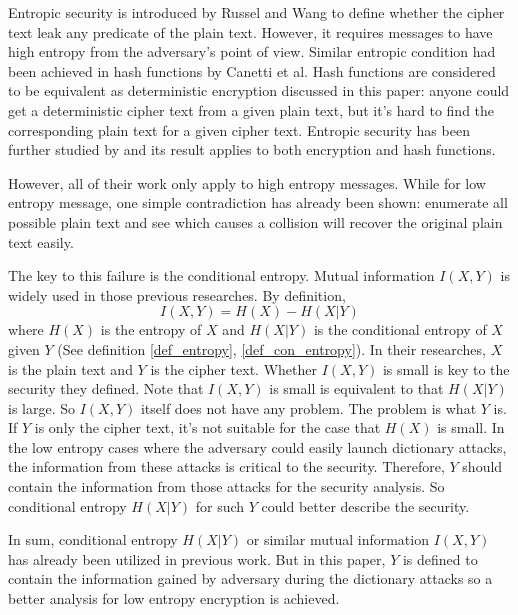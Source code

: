 \documentclass[10pt, conference, compsocconf]{IEEEtran}
\begin{document}
	Entropic security is introduced by Russel and Wang\cite{Russel02howto} to define
	whether the cipher text leak any predicate of the plain text. However,
	it requires messages to have high entropy from
	the adversary's point of view. Similar entropic condition had been
	achieved in hash functions by Canetti et al\cite{Canetti97towardsrealizing, Canetti_perfectlyone-way}. 
	Hash functions are
	considered to be equivalent as deterministic encryption discussed in this
	paper: anyone could get a deterministic cipher text from a
	given plain text, but it's hard to find the corresponding plain text
	for a given cipher text. Entropic security has been further 
	studied by \cite{entropic_wang}
	and its result applies to both encryption and hash functions.
	
	However, all of their work only apply to high entropy messages.
	While for low entropy message, 
	one simple contradiction has already been
	shown: enumerate all possible plain text and see which causes a collision
	will recover the original plain text easily.
	
	The key to this failure is the conditional entropy. Mutual information
	$I(X, Y)$ is widely used in those previous researches. By definition,
	\begin{equation}
		I(X, Y) = H(X) - H(X|Y)
	\end{equation}
	where $H(X)$ is the entropy of $X$ and $H(X|Y)$ is the conditional entropy
	of $X$ given $Y$ (See definition \ref{def_entropy}, \ref{def_con_entropy}).
	In their researches, $X$ is the plain text and $Y$ is the cipher text.
	Whether $I(X, Y)$ is small is key to the security they defined.
	Note that $I(X, Y)$ is small
	is equivalent to that $H(X|Y)$ is large. So $I(X, Y)$ itself does not have any problem.
	The problem is what $Y$ is.
	If $Y$ is only the cipher text, it's not suitable for the case that $H(X)$ is small.
	In the low entropy cases where the adversary could easily launch dictionary attacks,
	the information from these attacks is critical to the security. Therefore, $Y$
	should contain the information from those attacks for the security analysis.
	So conditional entropy $H(X|Y)$ for such $Y$ could better describe the security. 
		
	In sum, conditional entropy $H(X|Y)$ or similar mutual information $I(X, Y)$
	has already been utilized in previous work. But in this paper, $Y$ is defined to contain the information
	gained by adversary during the dictionary attacks so a better analysis
	for low entropy encryption is achieved.
	
\end{document}
